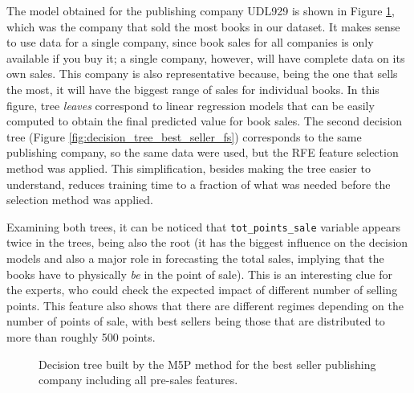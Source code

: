 \documentclass[a4paper,10pt,twocolumn,preprint,3p]{elsarticle}
\begin{document}
The model obtained for the publishing company UDL929 is shown in
Figure \ref{fig:decision_tree_best_seller}, which was the company that
sold the most books in our dataset. It makes sense to use data for a
single company, since book sales for all companies is only available
if you buy it; a single company, however, will have complete data on
its own sales. This company is also representative because, being the
one that sells the most, it will have the biggest range of sales for
individual books. In this figure, tree {\em leaves} correspond to
linear regression models that can be easily computed to obtain the
final predicted value for book sales.
The second decision tree (Figure
\ref{fig:decision_tree_best_seller_fs}) corresponds to the same
publishing company, so the same data were used, but the RFE %
feature selection method was applied. This simplification, besides making the
tree easier to understand, reduces training time to a fraction of what
was needed before the selection method was applied. 

Examining both trees, it can be noticed that
\texttt{tot\_points\_sale} variable appears twice in the trees, being also the root
(it has the biggest influence on the decision models and also a major role in forecasting the total sales, implying that the books have to physically {\em be} in the point of sale).
This is an interesting clue for the
experts, who could check the expected impact of different number of
selling points. This feature also shows that there are different
regimes depending on the number of points of sale, with best sellers
being those that are distributed to more than roughly 500 points. 


\begin{figure}[!ht] 
\begin{center}
\caption{Decision tree built by the M5P method for the best seller publishing 
	company including all pre-sales features.}
\label{fig:decision_tree_best_seller}
\end{center}
\end{figure}
\end{document}
